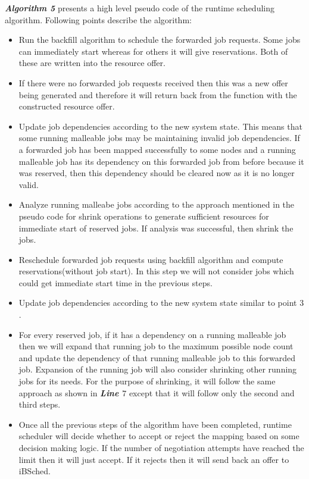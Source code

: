 \textbf{\textit{Algorithm 5}} presents a high level pseudo code of the runtime scheduling algorithm. Following points describe the algorithm:
\begin{itemize}
\item Run the backfill algorithm to schedule the forwarded job requests. Some jobs can immediately start whereas for others it will give reservations. Both of these are written into the resource offer.
\item If there were no forwarded job requests received then this was a new offer being generated and therefore it will return back from the function with the constructed resource offer.
\item Update job dependencies according to the new system state. This means that some running malleable jobs may be maintaining invalid job dependencies. If a forwarded job has been mapped successfully to some nodes and a running malleable job has its dependency on this forwarded job from before because it was reserved, then this dependency should be cleared now as it is no longer valid.
\item Analyze running malleabe jobs according to the approach mentioned in the pseudo code for shrink operations to generate sufficient resources for immediate start of reserved jobs. If analysis was successful, then shrink the jobs.
\item Reschedule forwarded job requests using backfill algorithm and compute reservations(without job start). In this step we will not consider jobs which could get immediate start time in the previous steps.
\item Update job dependencies according to the new system state similar to point $3$.
\item For every reserved job, if it has a dependency on a running malleable job then we will expand that running job to the maximum possible node count and update the dependency of that running malleable job to this forwarded job. Expansion of the running job will also consider shrinking other running jobs for its needs. For the purpose of shrinking, it will follow the same approach as shown in \textbf{\textit{Line $7$}} except that it will follow only the second and third steps.
\item Once all the previous steps of the algorithm have been completed, runtime scheduler will decide whether to accept or reject the mapping based on some decision making logic. If the number of negotiation attempts have reached the limit then it will just accept. If it rejects then it will send back an offer to iBSched.
\end{itemize}

